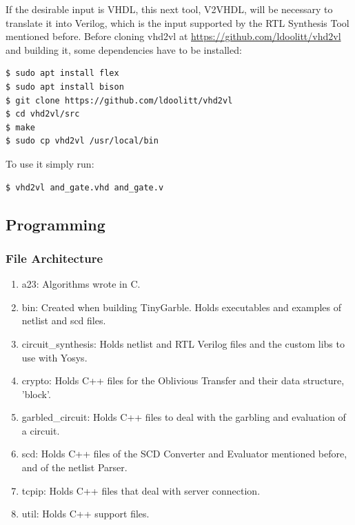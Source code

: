 \begin{refsection}
If the desirable input is VHDL, this next tool, V2VHDL, will be necessary to translate it into Verilog, which is the input supported by the RTL Synthesis Tool mentioned before.
Before cloning vhd2vl at \url{https://github.com/ldoolitt/vhd2vl} and building it, some dependencies have to be installed:

\begin{lstlisting}[caption={Installation of VHD2VL}, language=bash, captionpos=b]
$ sudo apt install flex
$ sudo apt install bison
$ git clone https://github.com/ldoolitt/vhd2vl
$ cd vhd2vl/src
$ make
$ sudo cp vhd2vl /usr/local/bin
\end{lstlisting}

To use it simply run:

\begin{lstlisting}[caption={Translation of VHDL file into Verilog}, language=bash, captionpos=b]
$ vhd2vl and_gate.vhd and_gate.v	
\end{lstlisting}

\newpage

\subsection{Programming}

\subsubsection{File Architecture}

\begin{enumerate}
\item a23: Algorithms wrote in C.
\item bin: Created when building TinyGarble. Holds executables and examples of netlist and scd files.
\item circuit\_synthesis: Holds netlist and RTL Verilog files and the custom libs to use with Yosys.
\item crypto: Holds C++ files for the Oblivious Transfer and their data structure, 'block'.
\item garbled\_circuit: Holds C++ files to deal with the garbling and evaluation of a circuit.
\item scd:  Holds C++ files of the SCD Converter and Evaluator mentioned before, and of the netlist Parser.
\item tcpip: Holds C++ files that deal with server connection.
\item util: Holds C++ support files.
\end{enumerate}


\end{refsection}
